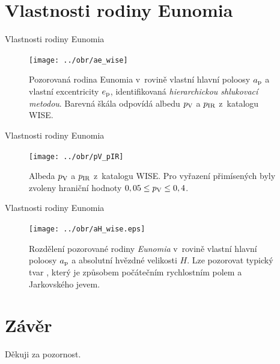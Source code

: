 \documentclass[xcolor=dvipsnames]{beamer}
\begin{document}
\section{Vlastnosti rodiny Eunomia}
\begin{frame}[t]{Vlastnosti rodiny Eunomia}
\begin{figure}
\centering
\texttt{[image: ../obr/ae\_wise]}
\caption{\footnotesize{Pozorovaná rodina Eunomia v~rovině vlastní hlavní poloosy $a_{\rm p}$ a vlastní excentricity $e_{\rm p}$, identifikovaná \textit{hierarchickou shlukovací metodou}. Barevná škála odpovídá albedu $p_{\rm V}$ a $p_{\rm IR}$ z~katalogu WISE\@.}}
\end{figure}
\end{frame}

\begin{frame}[t]{Vlastnosti rodiny Eunomia}
\begin{figure}
\centering
\texttt{[image: ../obr/pV\_pIR]}
\caption{\footnotesize{Albeda $p_{\rm V}$ a $p_{\rm IR}$ z~katalogu WISE. Pro vyřazení přimísených byly zvoleny hraniční hodnoty $0,05 \leq p_{\rm V} \leq 0,4$.}}
\end{figure}
\end{frame}

\begin{frame}[t]{Vlastnosti rodiny Eunomia}
\begin{figure}
\centering
\texttt{[image: ../obr/aH\_wise.eps]}
\caption{\footnotesize{Rozdělení pozorované rodiny \textit{Eunomia} v~rovině vlastní hlavní poloosy $a_{\rm p}$ a absolutní hvězdné velikosti $H$. Lze pozorovat typický tvar , který je způsobem počátečním rychlostním polem a Jarkovského jevem.}}
\end{figure}
\end{frame}

\section{Závěr}
\begin{frame}
\printbibliography
\end{frame}
\begin{frame}
Děkuji za pozornost.
\end{frame}
\end{document}
